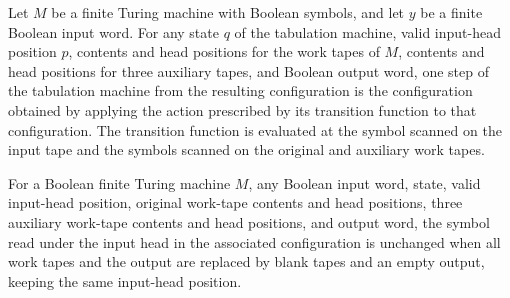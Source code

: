 \begin{theorem}
\label{Complexity.Meyer.tabTM_step}
\leanok
{}
Let $M$ be a finite Turing machine with Boolean symbols, and let $y$ be a finite Boolean
input word. For any state $q$ of the tabulation machine, valid input-head position $p$,
contents and head positions for the work tapes of $M$, contents and head positions for
three auxiliary tapes, and Boolean output word, one step of the tabulation machine from
the resulting configuration is the configuration obtained by applying the action
prescribed by its transition function to that configuration. The transition function is
evaluated at the symbol scanned on the input tape and the symbols scanned on the
original and auxiliary work tapes.
\end{theorem}

\begin{theorem}
\label{Complexity.Meyer.tcfg_inputSymbol}
\leanok
{}
For a Boolean finite Turing machine $M$, any Boolean input word, state, valid input-head
position, original work-tape contents and head positions, three auxiliary work-tape
contents and head positions, and output word, the symbol read under the input head in
the associated configuration is unchanged when all work tapes and the output are
replaced by blank tapes and an empty output, keeping the same input-head position.
\end{theorem}
